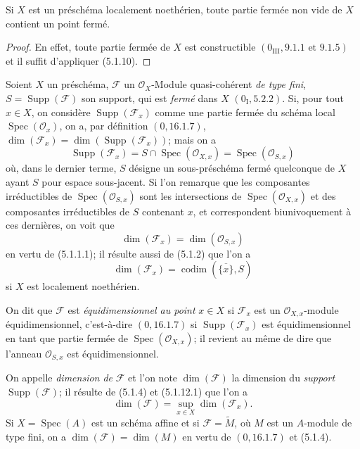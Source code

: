 \begin{corollary}[5.1.11]
\label{IV.2.5.1.11-fr}
Si $X$ est un préschéma localement noethérien, toute partie fermée non vide de
$X$ contient un point fermé.
\end{corollary}

\begin{proof}
En effet, toute partie fermée de $X$ est constructible
$(0_{\mathrm{III}},9.1.1\text{ et }9.1.5)$ et il suffit d'appliquer (5.1.10).
\end{proof}

\begin{env}[5.1.12]
\label{IV.2.5.1.12-fr}
Soient $X$ un préschéma, $\mathcal F$ un $\mathcal O_X$-Module
quasi-cohérent \emph{de type fini}, $S=\operatorname{Supp}(\mathcal F)$ son
support, qui est \emph{fermé} dans $X$ $(0_{\mathrm I},5.2.2)$. Si, pour tout
$x\in X$, on considère $\operatorname{Supp}(\mathcal F_x)$ comme une partie
fermée du schéma local $\operatorname{Spec}(\mathcal O_x)$, on a, par
définition $(0,16.1.7)$,
$\dim(\mathcal F_x)=\dim(\operatorname{Supp}(\mathcal F_x))$; mais on a
\[
\operatorname{Supp}(\mathcal F_x)
=S\cap\operatorname{Spec}(\mathcal O_{X,x})
=\operatorname{Spec}(\mathcal O_{S,x})
\]
où, dans le dernier terme, $S$ désigne un sous-préschéma fermé quelconque de
$X$ ayant $S$ pour espace sous-jacent. Si l'on remarque que les composantes
irréductibles de $\operatorname{Spec}(\mathcal O_{S,x})$ sont les
intersections de $\operatorname{Spec}(\mathcal O_{X,x})$ et des composantes
irréductibles de $S$ contenant $x$, et correspondent biunivoquement à ces
dernières, on voit que
\begin{equation}
\dim(\mathcal F_x)=\dim(\mathcal O_{S,x})
\tag{5.1.12.1}\label{IV.2.5.1.12.1-fr}
\end{equation}
en vertu de (5.1.1.1); il résulte aussi de (5.1.2) que l'on a
\begin{equation}
\dim(\mathcal F_x)=\operatorname{codim}(\overline{\{x\}},S)
\tag{5.1.12.2}\label{IV.2.5.1.12.2-fr}
\end{equation}
si $X$ est localement noethérien.

On dit que $\mathcal F$ est \emph{équidimensionnel au point} $x\in X$ si
$\mathcal F_x$ est un $\mathcal O_{X,x}$-module équidimensionnel,
c'est-à-dire $(0,16.1.7)$ si $\operatorname{Supp}(\mathcal F_x)$ est
équidimensionnel en tant que partie fermée de
$\operatorname{Spec}(\mathcal O_{X,x})$; il revient au même de dire que
l'anneau $\mathcal O_{S,x}$ est équidimensionnel.

On appelle \emph{dimension de} $\mathcal F$ et l'on note $\dim(\mathcal F)$
la dimension du \emph{support} $\operatorname{Supp}(\mathcal F)$; il résulte
de (5.1.4) et (5.1.12.1) que l'on a
\begin{equation}
\dim(\mathcal F)=\sup_{x\in X}\dim(\mathcal F_x).
\tag{5.1.12.3}\label{IV.2.5.1.12.3-fr}
\end{equation}
Si $X=\operatorname{Spec}(A)$ est un schéma affine et si
$\mathcal F=\widetilde M$, où $M$ est un $A$-module de type fini, on a
$\dim(\mathcal F)=\dim(M)$ en vertu de $(0,16.1.7)$ et (5.1.4).
\end{env}

